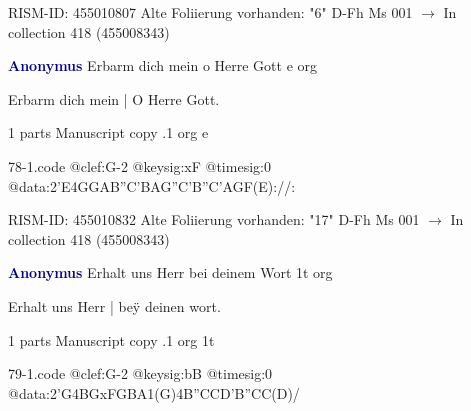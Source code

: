 \documentclass[twocolumn]{book}
\begin{document}
\newline RISM-ID: 455010807
\newline Alte Foliierung vorhanden: "6"
\newline D-Fh  Ms 001
\newline $\rightarrow$ In collection 418 (455008343)

\newline \par \vspace{7pt} \textcolor{darkblue}{\textbf{Anonymus  }}
\newline Erbarm dich mein o Herre Gott  e  
\newline org
\newline \begin{itshape}[f.17r, at left:] Erbarm dich mein | O Herre Gott.\end{itshape} 
\newline \textcolor{darkblue}{}  1 parts  
\newline Manuscript copy
.1  org  e  
\begin{filecontents*}{78-1.code}
@clef:G-2
@keysig:xF
@timesig:0
@data:2'E4GGAB''C'BAG''C'B''C'AGF(E)://:
\end{filecontents*}
\newline
%

\newline RISM-ID: 455010832
\newline Alte Foliierung vorhanden: "17"
\newline D-Fh  Ms 001
\newline $\rightarrow$ In collection 418 (455008343)

\newline \par \vspace{7pt} \textcolor{darkblue}{\textbf{Anonymus  }}
\newline Erhalt uns Herr bei deinem Wort  1t  
\newline org
\newline \begin{itshape}[f.20r, at left:] Erhalt uns Herr | beÿ deinen wort.\end{itshape} 
\newline \textcolor{darkblue}{}  1 parts  
\newline Manuscript copy
.1  org  1t  
\begin{filecontents*}{79-1.code}
@clef:G-2
@keysig:bB
@timesig:0
@data:2'G4BGxFGBA1(G)4B''CCD'B''CC(D)/
\end{filecontents*}
\newline
%
\end{document}
